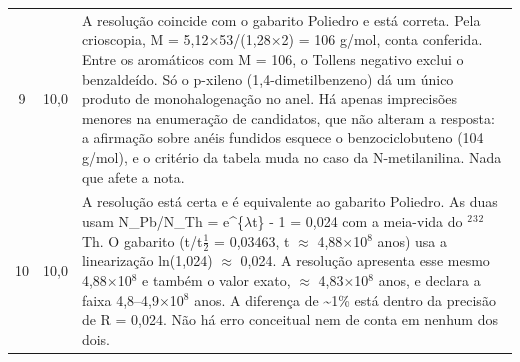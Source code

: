 \documentclass{article}%
\begin{document}
\begin{longtable}{@{}c c p{}@{}}
9 & 10,0 & A resolução coincide com o gabarito Poliedro e está correta. Pela crioscopia, M = 5,12$\times$53/(1,28$\times$2) = 106 g/mol, conta conferida. Entre os aromáticos com M = 106, o Tollens negativo exclui o benzaldeído. Só o p{-}xileno (1,4{-}dimetilbenzeno) dá um único produto de monohalogenação no anel. Há apenas imprecisões menores na enumeração de candidatos, que não alteram a resposta: a afirmação sobre anéis fundidos esquece o benzociclobuteno (104 g/mol), e o critério da tabela muda no caso da N{-}metilanilina. Nada que afete a nota. \\
10 & 10,0 & A resolução está certa e é equivalente ao gabarito Poliedro. As duas usam N\_Pb/N\_Th = e\^{}\{$\lambda$t\} - 1 = 0,024 com a meia{-}vida do $^2$$^3$$^2$Th. O gabarito (t/t$\frac12$ = 0,03463, t $\approx$ 4,88$\times$10$^{8}$ anos) usa a linearização ln(1,024) $\approx$ 0,024. A resolução apresenta esse mesmo 4,88$\times$10$^{8}$ e também o valor exato, $\approx$ 4,83$\times$10$^{8}$ anos, e declara a faixa 4,8--4,9$\times$10$^{8}$ anos. A diferença de \textasciitilde{}1\% está dentro da precisão de R = 0,024. Não há erro conceitual nem de conta em nenhum dos dois. \\
\bottomrule\end{longtable}%
\end{document}
